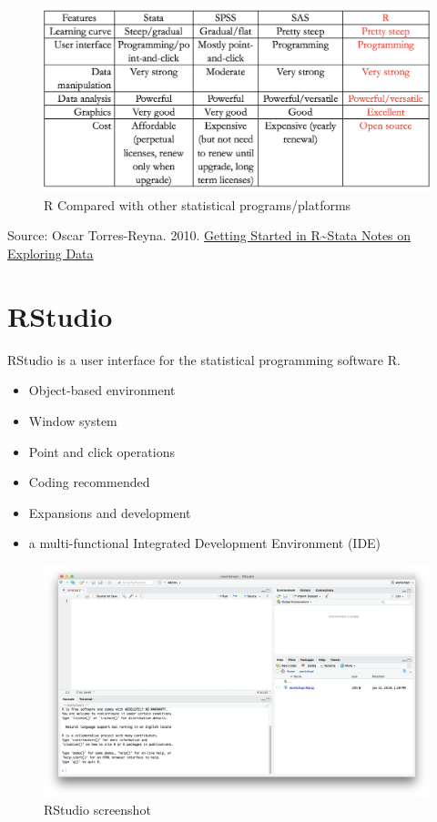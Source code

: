 \documentclass[]{book}
\providecommand{\tightlist}{%
  \setlength{\itemsep}{0pt}\setlength{\parskip}{0pt}}
\begin{document}
\begin{figure}
\includegraphics[width=1\linewidth]{Rcompare} \caption{R Compared with other statistical programs/platforms}\label{fig:Rcompare}
\end{figure}

Source: Oscar Torres-Reyna. 2010. \href{https://dss.princeton.edu/training/RStata.pdf}{Getting Started in R\textasciitilde Stata Notes on Exploring Data}

\hypertarget{rstudio}{%
\section{RStudio}\label{rstudio}}

RStudio is a user interface for the statistical programming software R.

\begin{itemize}
\tightlist
\item
  Object-based environment
\item
  Window system
\item
  Point and click operations
\item
  Coding recommended\\
\item
  Expansions and development
\item
  a multi-functional Integrated Development Environment (IDE)
\end{itemize}

\begin{figure}
\includegraphics[width=1\linewidth]{RStudioscreenshot} \caption{RStudio screenshot}\label{fig:Rstudioscreenshot}
\end{figure}
\end{document}
